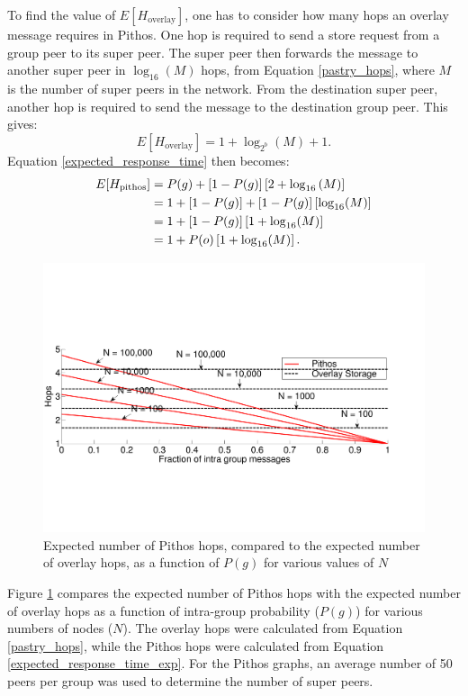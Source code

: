 \documentclass[10pt,a4paper,conference]{IEEEtran}
\begin{document}
To find the value of $E\left[H_{\textrm{overlay}}\right]$, one has to consider how many hops an overlay message requires in Pithos. One hop is
required to send a store request from a group peer to its super peer. The super peer then forwards the message to another super peer in
$\log_{16}(M)$ hops, from Equation \eqref{pastry_hops}, where $M$ is the number of super peers in the network. From the destination super peer,
another hop is required to send the message to the destination group peer. This gives:
%
\begin{equation}\label{group_hops}
    E\left[H_{\textrm{overlay}}\right] = 1 + \log_{2^b}(M) + 1.
\end{equation}
%
Equation \eqref{expected_response_time} then becomes:
%
\begin{align}
E[H_{\textrm{pithos}}] &= P(g) + \left[1 - P(g)\right]\left[2 + \log_{16}\left(M\right)\right]\notag\\
                       &= 1 + \left[1 - P(g)\right] + \left[1 - P(g)\right]\left[\log_{16}(M)\right]\notag\\
                       &= 1 + \left[1 - P(g)\right]\left[1 + \log_{16}(M)\right]\notag\\
                       &= 1 + P(o)\left[1 + \log_{16}(M)\right].\label{expected_response_time_exp}
\end{align}

\begin{figure}[htbp]
 \centering
 \includegraphics[clip=true, viewport=0cm 5cm 27cm 14.5cm, width=\columnwidth]{Hops_vsGroupFrac_4n}
 \caption{Expected number of Pithos hops, compared to the expected number of overlay hops, as a function of $P(g)$ for various values of $N$}
 \label{fig_hop_compare}
\end{figure}
%
Figure \ref{fig_hop_compare} compares the expected number of Pithos hops with the expected number of overlay hops as a function of intra-group
probability ($P(g)$) for various numbers of nodes ($N$). The overlay hops were calculated from Equation \eqref{pastry_hops}, while the Pithos hops
were calculated from Equation \eqref{expected_response_time_exp}. For the Pithos graphs, an average number of 50 peers per group was used to
determine the number of super peers.
\end{document}
